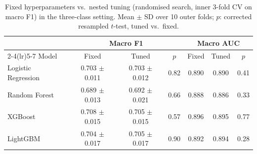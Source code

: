 \begin{table}[H]
\centering
\small
\caption{Fixed hyperparameters vs.\ nested tuning (randomised search, inner 3-fold CV on macro F1) in the three-class setting. Mean $\pm$ SD over 10 outer folds; $p$: corrected resampled $t$-test, tuned vs.\ fixed.}
\label{tab:tuning}
\begin{tabular}{lcccccc}
\toprule
 & \multicolumn{3}{c}{Macro F1} & \multicolumn{3}{c}{Macro AUC} \\
\cmidrule(lr){2-4}\cmidrule(lr){5-7}
Model & Fixed & Tuned & $p$ & Fixed & Tuned & $p$ \\
\midrule
Logistic Regression & 0.703 $\pm$ 0.011 & 0.703 $\pm$ 0.012 & 0.82 & 0.890 & 0.890 & 0.41 \\
Random Forest & 0.689 $\pm$ 0.013 & 0.692 $\pm$ 0.021 & 0.66 & 0.888 & 0.886 & 0.33 \\
XGBoost & 0.708 $\pm$ 0.015 & 0.705 $\pm$ 0.015 & 0.57 & 0.896 & 0.895 & 0.77 \\
LightGBM & 0.704 $\pm$ 0.017 & 0.705 $\pm$ 0.017 & 0.90 & 0.892 & 0.894 & 0.28 \\
\bottomrule
\end{tabular}
\end{table}
